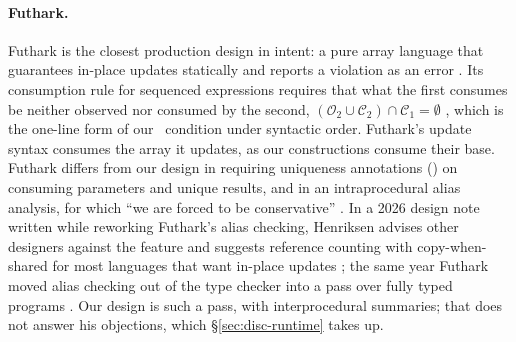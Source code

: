 \paragraph{Futhark.} Futhark is the closest production design in intent: a pure array language that
guarantees in-place updates statically and reports a violation as an error
\citep{henriksen2017futhark,henriksen2017thesis}. Its consumption rule for sequenced expressions
requires that what the first consumes be neither observed nor consumed by the second,
$(\mathcal{O}_2 \cup \mathcal{C}_2) \cap \mathcal{C}_1 = \emptyset$
\citep[Fig.~5, \textsc{Occurence-Seq}]{henriksen2017futhark}, which is the one-line form of our \Dead\
condition under syntactic order. Futhark's update syntax consumes the array it updates, as our constructions consume their base.
Futhark differs from our design in requiring uniqueness annotations
(\code{*}) on consuming parameters and unique results, and in an intraprocedural alias analysis, for which
``we are forced to be conservative'' \citep[\S3.2]{henriksen2017futhark}. In a 2026 design note written
while reworking Futhark's alias checking, Henriksen advises other designers against the feature and
suggests reference counting with copy-when-shared for most languages that want in-place updates
\citep{henriksen2026aliasing}; the same year Futhark moved alias checking out of the type checker into a
pass over fully typed programs \citep{henriksen2026rewrite}. Our design is such a pass, with
interprocedural summaries; that does not answer his objections, which \S\ref{sec:disc-runtime} takes up.

